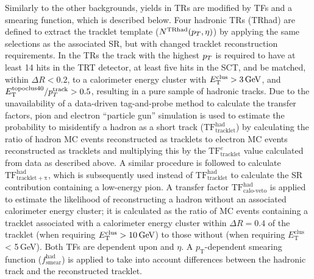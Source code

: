 Similarly to the other backgrounds, yields in TRs are modified by TFs and a smearing function, which is described below. Four hadronic TRs (TRhad) are defined to extract the tracklet \pt template ($N^{\mathrm{TRhad}}(p_T,\eta)$) by applying the same selections as the associated SR, but with changed tracklet reconstruction requirements. In the TRs the track with the highest $p_T$ is required to have at least 14 hits in the TRT detector, at least five hits in the SCT, and be matched, within $\Delta R < 0.2$, to a calorimeter energy cluster with $E_{\mathrm{T}}^{\mathrm{clus}} > 3\,\text{GeV}$, and $E_{\mathrm{T}}^{\mathrm{topoclus40}}/p_T^{\mathrm{track}} > 0.5$, resulting in a pure sample of hadronic tracks. Due to the unavailability of a data-driven tag-and-probe method to calculate the transfer factors, pion and electron \enquote{particle gun} simulation is used to estimate the probability to misidentify a hadron as a short track ($\mathrm{TF}^\mathrm{had}_{\mathrm{tracklet}}$) by calculating the ratio of hadron MC events reconstructed as tracklets to electron MC events reconstructed as tracklets and multiplying this by the $\mathrm{TF}^e_{\mathrm{tracklet}}$ value calculated from data as described above. A similar procedure is followed to calculate $\mathrm{TF}^\mathrm{had}_{\mathrm{tracklet+\pi}}$, which is subsequently used instead of $\mathrm{TF}^\mathrm{had}_{\mathrm{tracklet}}$ to calculate the SR contribution containing a low-energy pion. A transfer factor $\mathrm{TF}_{\textrm{calo-veto}}^{\mathrm{had}}$ is applied to estimate the likelihood of reconstructing a hadron without an associated calorimeter energy cluster; it is calculated as the ratio of MC events containing a tracklet associated with a calorimeter energy cluster within $\Delta R=0.4$ of the tracklet (when requiring $E_{\mathrm{T}}^{\mathrm{clus}} > 10\,\text{GeV}$) to those without (when requiring $E_{\mathrm{T}}^{\mathrm{clus}}$ < 5\,GeV). Both TFs are dependent upon \pt and $\eta$. A $p_{\mathrm{T}}$-dependent smearing function ($f^{\mathrm{had}}_{\mathrm{smear}}$) is applied to take into account differences between the hadronic track and the reconstructed tracklet. 

